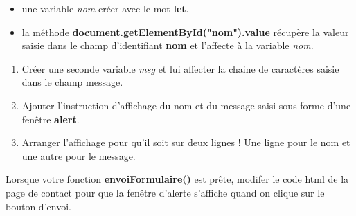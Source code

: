 \documentclass[11pt]{article}
\providecommand{\tightlist}{%
      \setlength{\itemsep}{0pt}\setlength{\parskip}{0pt}}
\begin{document}
\begin{itemize}
\tightlist
\item
  une variable \emph{nom} créer avec le mot \textbf{let}.
\item
  la méthode \textbf{document.getElementById("nom").value} récupère la
  valeur saisie dans le champ d'identifiant \textbf{nom} et l'affecte à
  la variable \emph{nom}.
\end{itemize}

\begin{enumerate}
\def\labelenumi{\arabic{enumi}.}
\tightlist
\item
  Créer une seconde variable \emph{msg} et lui affecter la chaine de
  caractères saisie dans le champ message.
\item
  Ajouter l'instruction d'affichage du nom et du message saisi sous
  forme d'une fenêtre \textbf{alert}.
\item
  Arranger l'affichage pour qu'il soit sur deux lignes ! Une ligne pour
  le nom et une autre pour le message.
\end{enumerate}

Lorsque votre fonction \textbf{envoiFormulaire()} est prête, modifer le
code html de la page de contact pour que la fenêtre d'alerte s'affiche
quand on clique sur le bouton d'envoi.

    
    
    
\end{document}

